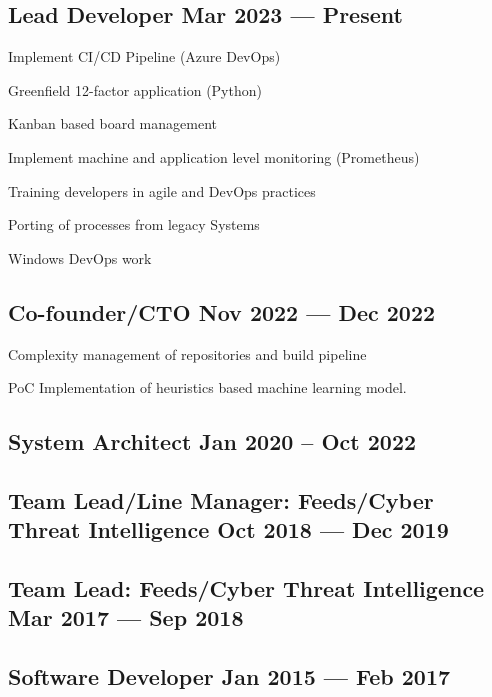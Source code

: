 \subsection{{Lead Developer \hfill Mar 2023 --- Present}}
\begin{zitemize}
	\item Implement CI/CD Pipeline (Azure DevOps)
	\item Greenfield 12-factor application (Python)
	\item Kanban based board management
	\item Implement machine and application level monitoring (Prometheus)
	\item Training developers in agile and DevOps practices
	\item Porting of processes from legacy Systems
	\item Windows DevOps work
\end{zitemize}
\subsection{{Co-founder/CTO \hfill Nov 2022 --- Dec 2022}}
\begin{zitemize}
	\item Complexity management of repositories and build pipeline
	\item PoC Implementation of heuristics based machine learning model.
\end{zitemize}

\subsection{{System Architect \hfill Jan 2020 -- Oct 2022}}
\subsection{{Team Lead/Line Manager: Feeds/Cyber Threat Intelligence \hfill Oct 2018 --- Dec 2019}}
\subsection{{Team Lead: Feeds/Cyber Threat Intelligence \hfill Mar 2017 --- Sep 2018}}
\subsection{{Software Developer \hfill Jan 2015 --- Feb 2017}}
